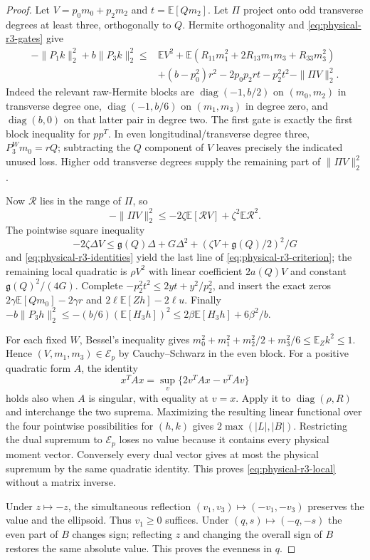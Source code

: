 \documentclass[11pt]{article}
\begin{document}
\begin{proof}
Let $V=p_0m_0+p_2m_2$ and $t=\mathbb E[Qm_2]$.
Let $\Pi$ project onto odd transverse degrees at least three,
orthogonally to $Q$.  Hermite orthogonality and
\eqref{eq:physical-r3-gates} give
\begin{align*}
 -\|P_1k\|_2^2+b\|P_3k\|_2^2
 \leq{}&\mathbb EV^2+
 \mathbb E(R_{11}m_1^2+2R_{13}m_1m_3+R_{33}m_3^2)\\
 &+(b-p_0^2)r^2-2p_0p_2rt-p_2^2t^2-\|\Pi V\|_2^2.
\end{align*}
Indeed the relevant raw-Hermite blocks are
$\operatorname{diag}(-1,b/2)$ on $(m_0,m_2)$ in transverse degree one,
$\operatorname{diag}(-1,b/6)$ on $(m_1,m_3)$ in degree zero, and
$\operatorname{diag}(b,0)$ on that latter pair in degree two.
The first gate is exactly the first block inequality for $pp^T$.
In even longitudinal/transverse degree three,
$P_3^Wm_0=rQ$; subtracting the $Q$ component of $V$ leaves precisely
the indicated unused loss.  Higher odd transverse degrees supply the
remaining part of $\|\Pi V\|_2^2$.

Now $\mathcal R$ lies in the range of $\Pi$, so
\[
 -\|\Pi V\|_2^2\leq-2\zeta\mathbb E[\mathcal RV]
                          +\zeta^2\mathbb E\mathcal R^2.
\]
The pointwise square inequality
\[
 -2\zeta\Delta V\leq \mathfrak g(Q)\Delta+G\Delta^2+
                    (\zeta V+\mathfrak g(Q)/2)^2/G
\]
and \eqref{eq:physical-r3-identities} yield the last line of
\eqref{eq:physical-r3-criterion}; the remaining local quadratic is
$\rho V^2$ with linear coefficient $2a(Q)V$ and constant $\mathfrak g(Q)^2/(4G)$.
Complete $-p_2^2t^2\leq2yt+y^2/p_2^2$, and insert the exact zeros
$2\gamma\mathbb E[Qm_0]-2\gamma r$ and
$2\ell\mathbb E[Zh]-2\ell u$.
Finally
$-b\|P_3h\|_2^2\leq-(b/6)(\mathbb E[H_3h])^2
\leq2\beta\mathbb E[H_3h]+6\beta^2/b$.

For each fixed $W$, Bessel's inequality gives
$m_0^2+m_1^2+m_2^2/2+m_3^2/6\leq\mathbb E_Zk^2\leq1$.
Hence $(V,m_1,m_3)\in\mathcal E_p$ by Cauchy--Schwarz in the even block.
For a positive quadratic form $A$, the identity
\[
 x^TAx=\sup_v\{2v^TAx-v^TAv\}
\]
holds also when $A$ is singular, with equality at $v=x$.
Apply it to $\operatorname{diag}(\rho,R)$ and interchange the two
suprema.  Maximizing the resulting linear functional over the four
pointwise possibilities for $(h,k)$ gives $2\max(|L|,|B|)$.
Restricting the dual supremum to $\mathcal E_p$ loses no value because
it contains every physical moment vector.  Conversely every dual vector
gives at most the physical supremum by the same quadratic identity.
This proves \eqref{eq:physical-r3-local} without a matrix inverse.

Under $z\mapsto-z$, the simultaneous reflection
$(v_1,v_3)\mapsto(-v_1,-v_3)$ preserves the value and the ellipsoid.
Thus $v_1\geq0$ suffices.  Under $(q,s)\mapsto(-q,-s)$ the even part
of $B$ changes sign; reflecting $z$ and changing the overall sign
of $B$ restores the same absolute value.  This proves the evenness in $q$.
\end{proof}
\end{document}
